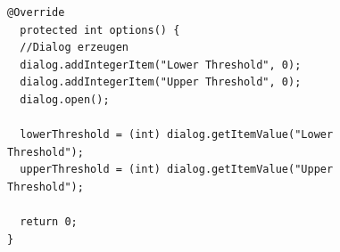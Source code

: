 \begin{figure}[htbp]
\begin{lstlisting}[frame=leftline]
@Override
  protected int options() {
  //Dialog erzeugen
  dialog.addIntegerItem("Lower Threshold", 0);
  dialog.addIntegerItem("Upper Threshold", 0);
  dialog.open();
		
  lowerThreshold = (int) dialog.getItemValue("Lower Threshold");
  upperThreshold = (int) dialog.getItemValue("Upper Threshold");

  return 0;
}
\end{lstlisting}
\end{figure}

